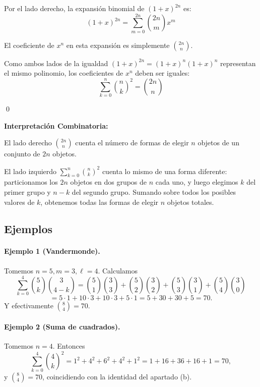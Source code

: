 Por el lado derecho, la expansión binomial de $(1+x)^{2n}$ es:
\[
(1+x)^{2n} = \sum_{m=0}^{2n} \binom{2n}{m} x^m
\]

El coeficiente de $x^n$ en esta expansión es simplemente $\binom{2n}{n}$.

Como ambos lados de la igualdad $(1+x)^{2n} = (1+x)^n(1+x)^n$ representan el mismo polinomio, los coeficientes de $x^n$ deben ser iguales:
\[
\sum_{k=0}^{n} \binom{n}{k}^2 = \binom{2n}{n}
\]

\qed

\textbf{Interpretación Combinatoria:}

El lado derecho $\binom{2n}{n}$ cuenta el número de formas de elegir $n$ objetos de un conjunto de $2n$ objetos.

El lado izquierdo $\sum_{k=0}^{n} \binom{n}{k}^2$ cuenta lo mismo de una forma diferente: particionamos los $2n$ objetos en dos grupos de $n$ cada uno, y luego elegimos $k$ del primer grupo y $n-k$ del segundo grupo. Sumando sobre todos los posibles valores de $k$, obtenemos todas las formas de elegir $n$ objetos totales.

\subsection*{Ejemplos}

\paragraph{Ejemplo 1 (Vandermonde).} Tomemos $n=5,m=3,\ell=4$. Calculamos
\[
\sum_{k=0}^{4}\binom{5}{k}\binom{3}{4-k} = \binom{5}{1}\binom{3}{3}+\binom{5}{2}\binom{3}{2}+\binom{5}{3}\binom{3}{1}+\binom{5}{4}\binom{3}{0}
\]
\[
=5\cdot1+10\cdot3+10\cdot3+5\cdot1=5+30+30+5=70.
\]
Y efectivamente $\binom{8}{4}=70$.

\paragraph{Ejemplo 2 (Suma de cuadrados).} Tomemos $n=4$. Entonces
\[
\sum_{k=0}^{4}\binom{4}{k}^2=1^2+4^2+6^2+4^2+1^2=1+16+36+16+1=70,
\]
y $\binom{8}{4}=70$, coincidiendo con la identidad del apartado (b).
